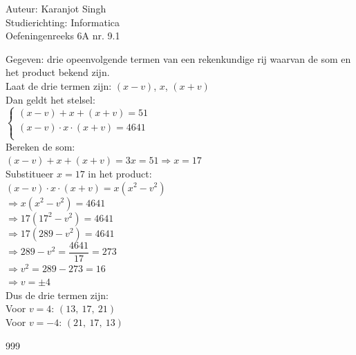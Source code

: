 \documentclass[a4paper]{article}
\begin{document}
\noindent \large Auteur: Karanjot Singh \\
\noindent \large Studierichting: Informatica \\
\noindent \large Oefeningenreeks 6A nr. 9.1 \\

\normalsize

Gegeven: drie opeenvolgende termen van een rekenkundige rij waarvan de som en het product bekend zijn.\\

Laat de drie termen zijn: $(x - v)$, $x$, $(x + v)$ \\

Dan geldt het stelsel: \\

$\left\{
\begin{array}{l}
(x - v) + x + (x + v) = 51 \\
(x - v) \cdot x \cdot (x + v) = 4641 \\
\end{array}
\right.$ \\

Bereken de som: \\

$(x - v) + x + (x + v) = 3x = 51 \Rightarrow x = 17$ \\

Substitueer $x = 17$ in het product: \\

$(x - v) \cdot x \cdot (x + v) = x(x^2 - v^2)$ \\

$\Rightarrow x(x^2 - v^2) = 4641$ \\

$\Rightarrow 17(17^2 - v^2) = 4641$ \\

$\Rightarrow 17(289 - v^2) = 4641$ \\

$\Rightarrow 289 - v^2 = \dfrac{4641}{17} = 273$ \\

$\Rightarrow v^2 = 289 - 273 = 16$ \\

$\Rightarrow v = \pm4$ \\

Dus de drie termen zijn: \\

Voor $v = 4$: $(13,\ 17,\ 21)$ \\

Voor $v = -4$: $(21,\ 17,\ 13)$ \\

\begin{thebibliography}{999}
\end{thebibliography}
\end{document}
